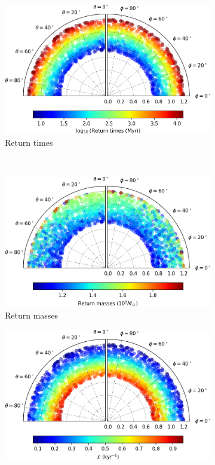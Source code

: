 \begin{figure}[h]
    \centering
    \begin{subfigure}[t]{0.4\textwidth}
        \includegraphics[width = \textwidth]{"../Files/Week 13/images/12_time"}
        \caption{Return times}
    \end{subfigure}
    ~ 
    \begin{subfigure}[t]{0.4\textwidth}
        \includegraphics[width=\textwidth]{"../Files/Week 13/images/12_mass"}
        \caption{Return masses}
    \end{subfigure}
    \begin{subfigure}[t]{0.4\textwidth}
        \includegraphics[width=\textwidth]{"../Files/Week 13/images/12_lyapunov"}

\end{subfigure}
\end{figure}

